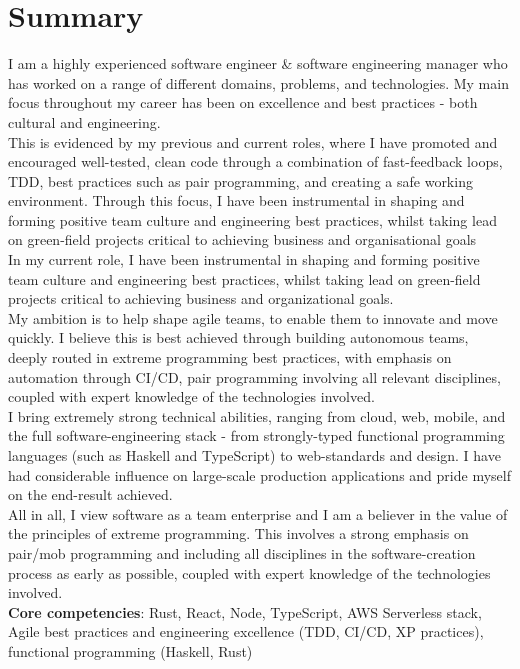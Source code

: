 \section{Summary}

I am a highly experienced software engineer \& software engineering manager who has worked on a range of different domains, problems, and technologies. My main focus throughout my career has been on excellence and best practices - both cultural and engineering.\\

This is evidenced by my previous and current roles, where I have promoted and encouraged well-tested, clean code through a combination of fast-feedback loops, TDD, best practices such as pair programming, and creating a safe working environment. Through this focus, I have been instrumental in shaping and forming positive team culture and engineering best practices, whilst taking lead on green-field projects critical to achieving business and organisational goals\\

In my current role, I have been instrumental in shaping and forming positive team culture and engineering best practices, whilst taking lead on green-field projects critical to achieving business and organizational goals.\\

My ambition is to help shape agile teams, to enable them to innovate and move quickly. I believe this is best achieved through building autonomous teams, deeply routed in extreme programming best practices, with emphasis on automation through CI/CD, pair programming involving all relevant disciplines, coupled with expert knowledge of the technologies involved.\\

I bring extremely strong technical abilities, ranging from cloud, web, mobile, and the full software-engineering stack - from strongly-typed functional programming languages (such as Haskell and TypeScript) to web-standards and design. I have had considerable influence on large-scale production applications and pride myself on the end-result achieved.\\

All in all, I view software as a team enterprise and I am a believer in the value of the principles of extreme programming. This involves a strong emphasis on pair/mob programming and including all disciplines in the software-creation process as early as possible, coupled with expert knowledge of the technologies involved.\\

\textbf{Core competencies}: Rust, React, Node, TypeScript, AWS Serverless stack, Agile best practices and engineering excellence (TDD, CI/CD, XP practices), functional programming (Haskell, Rust)
